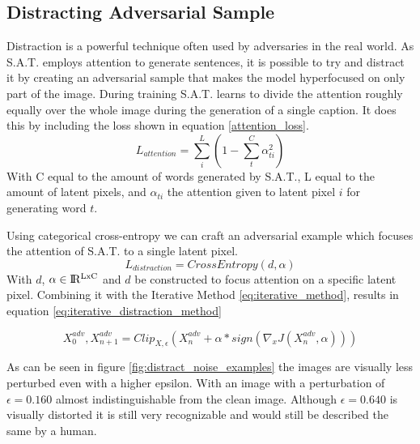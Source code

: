 \subsection*{Distracting Adversarial Sample}
Distraction is a powerful technique often used by adversaries in the real world. As S.A.T. employs attention to generate sentences, it is possible to try and distract it by creating an adversarial sample that makes the model hyperfocused on only part of the image. During training S.A.T. learns to divide the attention roughly equally over the whole image during the generation of a single caption. It does this by including the loss shown in equation \ref{attention_loss}.
\begin{equation}
    L_{attention} = \sum^{L}_i (1 - \sum^{C}_{t} \alpha_{ti}^2)
    \label{attention_loss}
\end{equation}
\noindent With C equal to the amount of words generated by S.A.T., L equal to the amount of latent pixels, and $\alpha_{ti}$ the attention given to latent pixel $i$ for generating word $t$.

Using categorical cross-entropy we can craft an adversarial example which focuses the attention of S.A.T. to a single latent pixel.
\begin{equation}
    L_{distraction} = CrossEntropy(d, \alpha)
    \label{distraction_loss}
\end{equation}
With $d$, $\alpha \in \rm I\!R^{LxC}$ and $d$ be constructed to focus attention on a specific latent pixel. Combining it with the Iterative Method \ref{eq:iterative_method}, results in equation \ref{eq:iterative_distraction_method}

\begin{equation}
    X^{adv}_{0}, X^{adv}_{n + 1} = Clip_{X, \epsilon}(X^{adv}_{n} + \alpha * sign(\nabla_{x}J(X^{adv}_{n}, \alpha)))
    \label{eq:iterative_distraction_method}
\end{equation}

As can be seen in figure \ref{fig:distract_noise_examples} the images are visually less perturbed even with a higher epsilon. With an image with a perturbation of $\epsilon=0.160$ almost indistinguishable from the clean image. Although $\epsilon=0.640$ is visually distorted it is still very recognizable and would still be described the same by a human.


